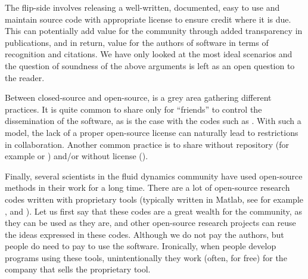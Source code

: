 The flip-side involves releasing a well-written, documented, easy to use and
maintain source code with appropriate license to ensure credit where it is due.
This can potentially add value for the community through added transparency in
publications, and in return, value for the authors of software in terms of
recognition and citations. We have only looked at the most ideal scenarios and
the question of soundness of the above arguments is left as an open question to
the reader.

Between closed-source and open-source, is a grey area gathering different
practices.
%
It is quite common to share only for ``friends'' to control the dissemination
of the software, as is the case with the codes such as
.
%
%
With such a model, the lack of a proper open-source license can naturally lead
to restrictions in collaboration.
%
Another common practice is to share without repository (for example
 or
) and/or
without license ().

Finally, several scientists in the fluid dynamics community have used
open-source methods in their work for a long time.
%
There are a lot of open-source research codes written with proprietary tools
(typically written in Matlab, see for example
,
 and
).
%
Let us first say that these codes are a great wealth for the community, as they
can be used as they are, and other open-source research projects can reuse 
the ideas expressed in these codes.
%
Although we do not pay the authors, but people do need to pay to use the
software. 
%
Ironically, when people develop programs using these tools, unintentionally
they work (often, for free) for the company that sells the proprietary tool.

